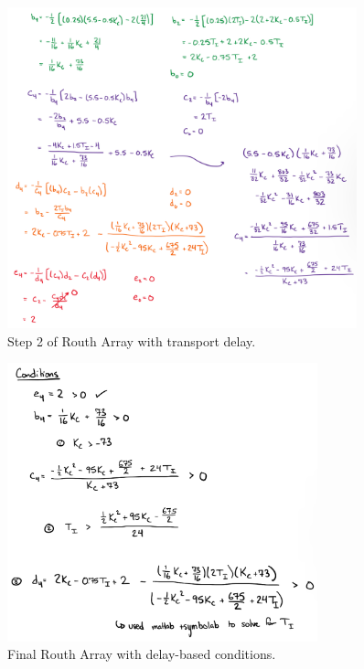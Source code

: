 \documentclass[12pt]{article}
\begin{document}
\begin{enumerate}
\begin{enumerate}
      \begin{figure}[H]
        \centering
        \includegraphics[width=0.9\textwidth]{Figures/figure1-4b.png}
        \caption{Step 2 of Routh Array with transport delay.}
      \end{figure}
  
      \begin{figure}[H]
        \centering
        \includegraphics[width=0.8\textwidth]{Figures/figure1-4c.png}
        \caption{Final Routh Array with delay-based conditions.}
      \end{figure}
  

\end{enumerate}
\end{enumerate}
\end{document}
